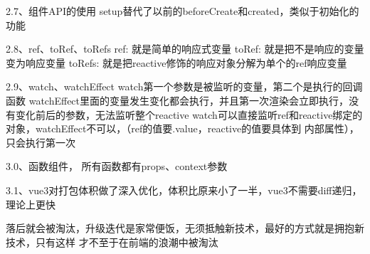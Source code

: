 2.7、组件API的使用
setup替代了以前的beforeCreate和created，类似于初始化的功能

2.8、ref、toRef、toRefs
ref: 就是简单的响应式变量
toRef: 就是把不是响应的变量变为响应变量
toRefs: 就是把reactive修饰的响应对象分解为单个的ref响应变量

2.9、watch、watchEffect
watch第一个参数是被监听的变量，第二个是执行的回调函数
watchEffect里面的变量发生变化都会执行，并且第一次渲染会立即执行，没有变化前后的参数，无法监听整个reactive
watch可以直接监听ref和reactive绑定的对象，watchEffect不可以，（ref的值要.value，reactive的值要具体到
内部属性），只会执行第一次

3.0、函数组件，
所有函数都有props、context参数

3.1、vue3对打包体积做了深入优化，体积比原来小了一半，vue3不需要diff递归，理论上更快

落后就会被淘汰，升级迭代是家常便饭，无须抵触新技术，最好的方式就是拥抱新技术，只有这样
才不至于在前端的浪潮中被淘汰
